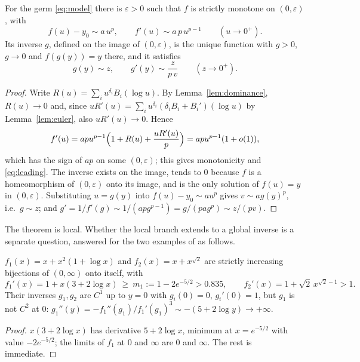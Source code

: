 \begin{theorem}
\label{thm:branch}
For the germ \eqref{eq:model} there is $\varepsilon>0$ such that $f$ is strictly monotone on $(0,\varepsilon)$, with
\begin{equation}
 f(u)-y_0\sim a\,u^p,\qquad f'(u)\sim a\,p\,u^{p-1}\qquad(u\to0^+).
 \label{eq:leading}
\end{equation}
Its inverse $g$, defined on the image of $(0,\varepsilon)$, is the unique function with $g>0$, $g\to0$ and $f(g(y))=y$ there, and it satisfies
\begin{equation}
 g(y)\sim z,\qquad g'(y)\sim\frac{z}{p\,v}\qquad(z\to0^+).
 \label{eq:inverse-leading}
\end{equation}
\end{theorem}
\begin{proof}
Write $R(u)=\sum_iu^{\delta_i}B_i(\log u)$. By Lemma~\ref{lem:dominance}, $R(u)\to0$ and, since $uR'(u)=\sum_iu^{\delta_i}(\delta_iB_i+B_i')(\log u)$ by Lemma~\ref{lem:euler}, also $uR'(u)\to0$. Hence
\[
 f'(u)=apu^{p-1}\Bigl(1+R(u)+\frac{uR'(u)}{p}\Bigr)=apu^{p-1}(1+o(1)),
\]
which has the sign of $ap$ on some $(0,\varepsilon)$; this gives monotonicity and \eqref{eq:leading}. The inverse exists on the image, tends to $0$ because $f$ is a homeomorphism of $(0,\varepsilon)$ onto its image, and is the only solution of $f(u)=y$ in $(0,\varepsilon)$. Substituting $u=g(y)$ into $f(u)-y_0\sim au^p$ gives $v\sim ag(y)^p$, i.e.\ $g\sim z$; and $g'=1/f'(g)\sim1/(apg^{p-1})=g/(pag^p)\sim z/(pv)$.
\end{proof}

The theorem is local. Whether the local branch extends to a global inverse is a separate question, answered for the two examples of \cite{q1} as follows.

\begin{proposition}
\label{prop:global}
$f_1(x)=x+x^2(1+\log x)$ and $f_2(x)=x+x^{\sqrt2}$ are strictly increasing bijections of $(0,\infty)$ onto itself, with
\begin{equation}
 f_1'(x)=1+x(3+2\log x)\ \ge\ m_1:=1-2e^{-5/2}>0.835,\qquad f_2'(x)=1+\sqrt2\,x^{\sqrt2-1}>1.
 \label{eq:global-slopes}
\end{equation}
Their inverses $g_1,g_2$ are $C^1$ up to $y=0$ with $g_i(0)=0$, $g_i'(0)=1$, but $g_1$ is not $C^2$ at $0$: $g_1''(y)=-f_1''(g_1)/f_1'(g_1)^3\sim-(5+2\log y)\to+\infty$.
\end{proposition}
\begin{proof}
$x(3+2\log x)$ has derivative $5+2\log x$, minimum at $x=e^{-5/2}$ with value $-2e^{-5/2}$; the limits of $f_1$ at $0$ and $\infty$ are $0$ and $\infty$. The rest is immediate.
\end{proof}


